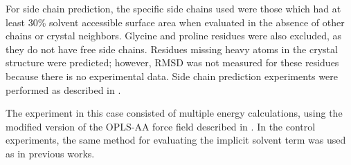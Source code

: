 For side chain prediction, the specific side chains used were those which had at least 30\% solvent accessible surface area when evaluated in the absence of other chains or crystal neighbors.
Glycine and proline residues were also excluded, as they do not have free side chains.
Residues missing heavy atoms in the crystal structure were predicted; however, RMSD was not measured for these residues because there is no experimental data.
Side chain prediction experiments were performed as described in \cite{jacobson2002role}.

The experiment in this case consisted of multiple energy calculations, using the modified version of the OPLS-AA force field described in \cite{li2011vsgb}.
In the control experiments, the same method for evaluating the implicit solvent term was used as in previous works.

